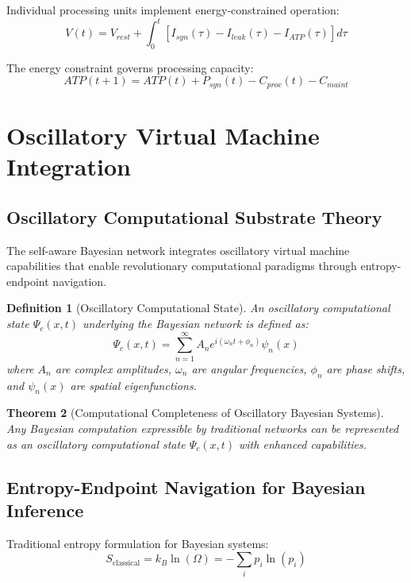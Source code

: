\documentclass[12pt,a4paper]{article}
\newtheorem{theorem}{Theorem}[section]
\newtheorem{definition}[theorem]{Definition}
\begin{document}
Individual processing units implement energy-constrained operation:
\begin{equation}
V(t) = V_{rest} + \int_0^t [I_{syn}(\tau) - I_{leak}(\tau) - I_{ATP}(\tau)]d\tau
\end{equation}

The energy constraint governs processing capacity:
\begin{equation}
ATP(t+1) = ATP(t) + P_{syn}(t) - C_{proc}(t) - C_{maint}
\end{equation}

\section{Oscillatory Virtual Machine Integration}

\subsection{Oscillatory Computational Substrate Theory}

The self-aware Bayesian network integrates oscillatory virtual machine capabilities that enable revolutionary computational paradigms through entropy-endpoint navigation.

\begin{definition}[Oscillatory Computational State]
An oscillatory computational state $\Psi_c(x,t)$ underlying the Bayesian network is defined as:
\begin{equation}
\Psi_c(x,t) = \sum_{n=1}^{\infty} A_n e^{i(\omega_n t + \phi_n)} \psi_n(x)
\end{equation}
where $A_n$ are complex amplitudes, $\omega_n$ are angular frequencies, $\phi_n$ are phase shifts, and $\psi_n(x)$ are spatial eigenfunctions.
\end{definition}

\begin{theorem}[Computational Completeness of Oscillatory Bayesian Systems]
Any Bayesian computation expressible by traditional networks can be represented as an oscillatory computational state $\Psi_c(x,t)$ with enhanced capabilities.
\end{theorem}

\subsection{Entropy-Endpoint Navigation for Bayesian Inference}

Traditional entropy formulation for Bayesian systems:
\begin{equation}
S_{\text{classical}} = k_B \ln(\Omega) = -\sum_i p_i \ln(p_i)
\end{equation}
\end{document}
